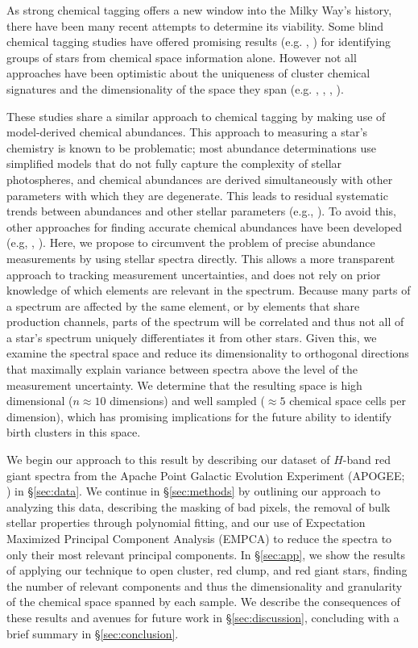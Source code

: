 \documentclass[a4paper,fleqn,usenatbib]{mnras}
\begin{document}
As strong chemical tagging offers a new window into the Milky Way's history, there have been many recent attempts to determine its viability. Some blind chemical tagging studies have offered promising results (e.g. \citealt{Hogg2016}, \citealt{Jofre2016}) for identifying groups of stars from chemical space information alone. However not all approaches have been optimistic about the uniqueness of cluster chemical signatures and the dimensionality of the space they span (e.g. \citealt{Mitschang2014}, \citealt{Ting2015a}, \citealt{Blanco-Cuaresma2016}, \citealt{Ness2017}). 

These studies share a similar approach to chemical tagging by making use of model-derived chemical abundances. This approach to measuring a star's chemistry is known to be problematic; most abundance determinations use simplified models that do not fully capture the complexity of stellar photospheres, and chemical abundances are derived simultaneously with other parameters with which they are degenerate. This leads to residual systematic trends between abundances and other stellar parameters (e.g., \citealt{Holtzman2015}). To avoid this, other approaches for finding accurate chemical abundances have been developed (e.g, \citealt{Ness2015}, \citealt{Rix2016}). Here, we propose to circumvent the problem of precise abundance measurements by using stellar spectra directly. This allows a more transparent approach to tracking measurement uncertainties, and does not rely on prior knowledge of which elements are relevant in the spectrum. Because many parts of a spectrum are affected by the same element, or by elements that share production channels, parts of the spectrum will be correlated and thus not all of a star's spectrum uniquely differentiates it from other stars. Given this, we examine the spectral space and reduce its dimensionality to orthogonal directions that maximally explain variance between spectra above the level of the measurement uncertainty. We determine that the resulting space is high dimensional ($n \approx10$ dimensions) and well sampled ($\approx 5$ chemical space cells per dimension), which has promising implications for the future ability to identify birth clusters in this space.

We begin our approach to this result by describing our dataset of $H$-band red giant spectra from the Apache Point Galactic Evolution Experiment (APOGEE; \citealt{Majewski2015}) in \S\ref{sec:data}. We continue in \S\ref{sec:methods} by outlining our approach to analyzing this data, describing the masking of bad pixels, the removal of bulk stellar properties through polynomial fitting, and our use of Expectation Maximized Principal Component Analysis (EMPCA) to reduce the spectra to only their most relevant principal components. In \S\ref{sec:app}, we show the results of applying our technique to open cluster, red clump, and red giant stars, finding the number of relevant components and thus the dimensionality and granularity of the chemical space spanned by each sample. We describe the consequences of these results and avenues for future work in \S\ref{sec:discussion}, concluding with a brief summary in \S\ref{sec:conclusion}.
\end{document}
